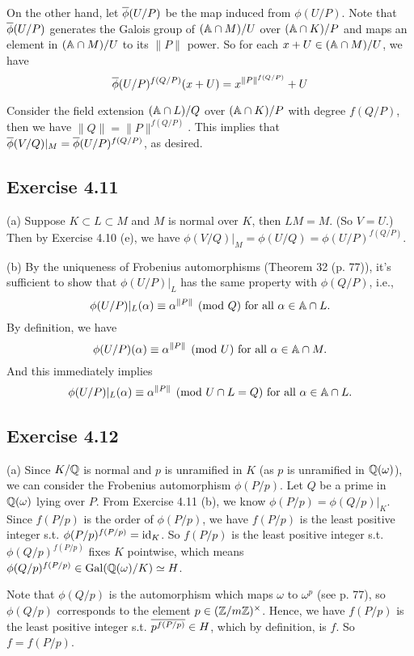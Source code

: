 \documentclass[../Marcus.tex]{subfiles}
\begin{document}
On the other hand, let $\ovl{\phi}(U/P)$ be the map induced from $\phi(U/P)$. Note that $\ovl{\phi}(U/P)$ generates the Galois group of $(\AA \cap M)/U$ over $(\AA \cap K)/P$ and maps an element in $(\AA \cap M)/U$ to its $\|P\|$ power. So for each $x+U \in (\AA \cap M)/U$, we have
$$
\ovl{\phi}(U/P)^{f(Q/P)}(x+U)=x^{\|P\|^{f(Q/P)}}+U
$$

Consider the field extension $(\AA \cap L)/Q$ over $(\AA \cap K)/P$ with degree $f(Q/P)$, then we have $\|Q\|=\|P\|^{f(Q/P)}$. This implies that $\ovl{\phi}(V/Q)|_M=\ovl{\phi}(U/P)^{f(Q/P)}$, as desired.

\subsection*{Exercise 4.11}

(a) Suppose $K\subset L\subset M$ and $M$ is normal over $K$, then $LM=M$. (So $V=U$.) Then by Exercise 4.10 (e), we have $\phi(V/Q)|_M=\phi(U/Q)=\phi(U/P)^{f(Q/P)}$.

(b) By the uniqueness of Frobenius automorphisms (Theorem 32 (p. 77)), it's sufficient to show that $\phi(U/P)|_L$ has the same property with $\phi(Q/P)$, i.e.,
$$
\phi(U/P)|_L(\alpha)\equiv\alpha^{\|P\|} \pmod{Q} \text{ for all } \alpha\in \AA \cap L.
$$
By definition, we have
$$
\phi(U/P)(\alpha)\equiv\alpha^{\|P\|} \pmod{U} \text{ for all } \alpha\in \AA \cap M.
$$
And this immediately implies
$$
\phi(U/P)|_L(\alpha)\equiv\alpha^{\|P\|} \pmod{U \cap L = Q} \text{ for all } \alpha\in \AA \cap L.
$$

\subsection*{Exercise 4.12}

(a) Since $K/\QQ$ is normal and $p$ is unramified in $K$ (as $p$ is unramified in $\QQ(\omega)$), we can consider the Frobenius automorphism $\phi(P/p)$. Let $Q$ be a prime in $\QQ(\omega)$ lying over $P$. From Exercise 4.11 (b), we know $\phi(P/p)=\phi(Q/p)|_K$. Since $f(P/p)$ is the order of $\phi(P/p)$, we have $f(P/p)$ is the least positive integer s.t. $\phi(P/p)^{f(P/p)}=\id_K$. So $f(P/p)$ is the least positive integer s.t. $\phi(Q/p)^{f(P/p)}$ fixes $K$ pointwise, which means $\phi(Q/p)^{f(P/p)} \in \Gal(\QQ(\omega)/K) \simeq H$.

Note that $\phi(Q/p)$ is the automorphism which maps $\omega$ to $\omega^p$ (see p. 77), so $\phi(Q/p)$ corresponds to the element $p\in(\ZZ/m\ZZ)^\times$. Hence, we have $f(P/p)$ is the least positive integer s.t. $\ovl{p^{f(P/p)}}\in H$, which by definition, is $f$. So $f=f(P/p)$.
\end{document}
